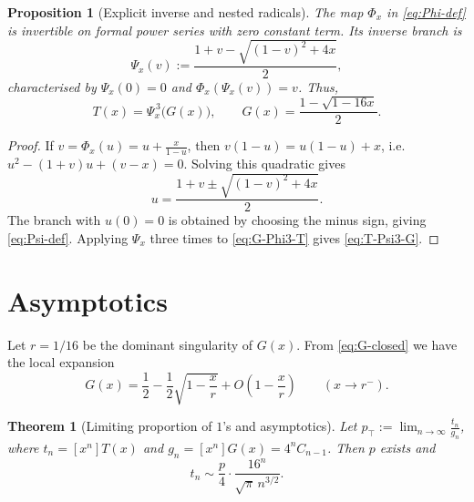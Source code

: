\documentclass[11pt]{article}
\newtheorem{proposition}{Proposition}
\newtheorem{theorem}{Theorem}
\newcommand{\ptop}{p_{\top}}
\begin{document}
\medskip 

\begin{proposition}[Explicit inverse and nested radicals]\label{prop:Psi-inverse-godel4}
The map \(\Phi_x\) in \eqref{eq:Phi-def} is invertible on formal power series with zero
constant term. Its inverse branch is
\begin{equation}\label{eq:Psi-def}
\Psi_x(v):=\frac{1+v-\sqrt{(1-v)^2+4x}}{2},
\end{equation}
characterised by \(\Psi_x(0)=0\) and \(\Phi_x(\Psi_x(v))=v\).
Thus,
\begin{equation}\label{eq:T-Psi3-G}
\boxed{\,T(x)=\Psi_x^{\,3}\!\big(G(x)\big),\qquad
G(x)=\frac{1-\sqrt{1-16x}}{2}.\,}
\end{equation}
\end{proposition}

\begin{proof}
If \(v=\Phi_x(u)=u+\frac{x}{1-u}\), then \(v(1-u)=u(1-u)+x\), i.e.
\(u^2-(1+v)u+(v-x)=0\). Solving this quadratic gives
\[
u=\frac{1+v\pm\sqrt{(1-v)^2+4x}}{2}.
\]
The branch with \(u(0)=0\) is obtained by choosing the minus sign, giving \eqref{eq:Psi-def}.
Applying \(\Psi_x\) three times to \eqref{eq:G-Phi3-T} gives \eqref{eq:T-Psi3-G}.
\end{proof}

\medskip



\section{Asymptotics}

Let \(r=1/16\) be the dominant singularity of \(G(x)\). From \eqref{eq:G-closed} we have the
local expansion
\begin{equation}\label{eq:G-local}
G(x)=\frac12-\frac12\sqrt{1-\frac{x}{r}}+O\!\left(1-\frac{x}{r}\right)\qquad (x\to r^-).
\end{equation}

\newpage

\begin{theorem}[Limiting proportion of $1$'s and asymptotics]\label{thm:limit-ones-godel4}
Let \(\ptop:=\lim_{n\to\infty} \frac{t_n}{g_n}\), where \(t_n=[x^n]T(x)\) and
\(g_n=[x^n]G(x)=4^nC_{n-1}\). Then \(p\) exists and
\[
t_n \sim \frac{p}{4}\cdot \frac{16^n}{\sqrt{\pi}\,n^{3/2}}.
\]
\end{theorem}
\end{document}
